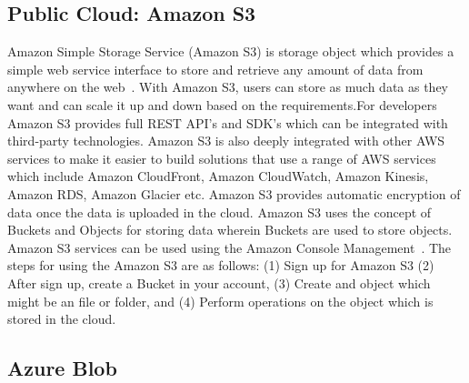 {     \pv
     
\subsection{Public Cloud: Amazon S3}

Amazon Simple Storage Service (Amazon S3) is storage object which
provides a simple web service interface to store and retrieve any
amount of data from anywhere on the web~\cite{www-amazon-s3}. With
Amazon S3, users can store as much data as they want and can scale it
up and down based on the requirements.For developers Amazon S3
provides full REST API's and SDK's which can be integrated with
third-party technologies. Amazon S3 is also deeply integrated with
other AWS services to make it easier to build solutions that use a
range of AWS services which include Amazon CloudFront, Amazon
CloudWatch, Amazon Kinesis, Amazon RDS, Amazon Glacier etc. Amazon S3
provides automatic encryption of data once the data is uploaded in the
cloud. Amazon S3 uses the concept of Buckets and Objects for storing
data wherein Buckets are used to store objects. Amazon S3 services can
be used using the Amazon Console
Management~\cite{www-amazon-s3-docs}. The steps for using the Amazon
S3 are as follows: (1) Sign up for Amazon S3 (2) After sign up, create
a Bucket in your account, (3) Create and object which might be an file
or folder, and (4) Perform operations on the object which is stored in
the cloud.

     \pv

	
\subsection{Azure Blob}

}
